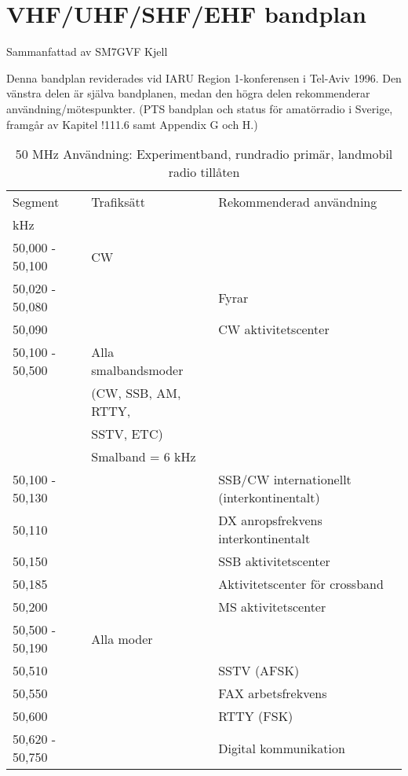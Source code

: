 \section{VHF/UHF/SHF/EHF bandplan}


Sammanfattad av SM7GVF Kjell

Denna bandplan reviderades vid IARU Region 1-konferensen i Tel-Aviv 1996.
Den vänstra delen är själva bandplanen, medan den högra delen rekommenderar användning/mötespunkter.
(PTS bandplan och status för amatörradio i Sverige, framgår av Kapitel !111.6 samt Appendix G och H.)


\setlongtables
\begin{longtable}{lll}
\caption{50 MHz Användning: Experimentband, rundradio primär, landmobil radio tillåten} \\
Segment & Trafiksätt & Rekommenderad användning \\
kHz     &            & \\ \hline
\endhead
50,000 - 50,100 & CW & \\
50,020 - 50,080 & & Fyrar \\
50,090          & & CW aktivitetscenter \\

50,100 - 50,500 & Alla smalbandsmoder & \\
                & (CW, SSB, AM, RTTY, & \\
                & SSTV, ETC)          & \\
                & Smalband = 6 kHz    & \\
50,100 - 50,130 &  & SSB/CW internationellt (interkontinentalt) \\
50,110          &  & DX anropsfrekvens interkontinentalt \\
50,150          &  & SSB aktivitetscenter \\
50,185          &  & Aktivitetscenter för crossband \\
50,200          &  & MS aktivitetscenter \\

50,500 - 50,190 & Alla moder & \\
50,510          & & SSTV (AFSK) \\
50,550          & & FAX arbetsfrekvens \\
50,600          & & RTTY (FSK) \\
50,620 - 50,750 & & Digital kommunikation \\
\end{longtable}

